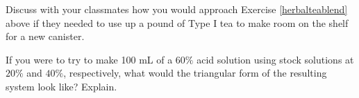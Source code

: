 \documentclass{ximera}
\begin{document}
\begin{problem}
Discuss with your classmates how you would approach Exercise \ref{herbalteablend} above if they needed to use up a pound of Type I tea to make room on the shelf for a new canister.
\end{problem}

\begin{problem}
If you were to try to make 100 mL of a $60\%$ acid solution using stock solutions at $20\%$ and $40\%$, respectively, what would the triangular form of the resulting system look like?  Explain.
\end{problem}
\end{document}

